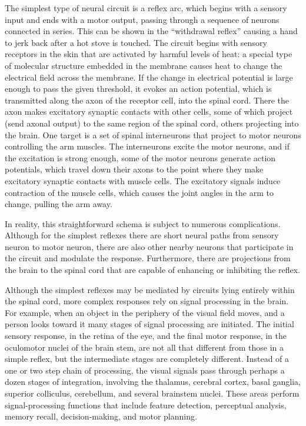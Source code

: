 \documentclass[]{book}
\begin{document}
The simplest type of neural circuit is a reflex arc, which begins with a sensory input and ends with a motor output, passing through a sequence of neurons connected in series. This can be shown in the ``withdrawal reflex'' causing a hand to jerk back after a hot stove is touched. The circuit begins with sensory receptors in the skin that are activated by harmful levels of heat: a special type of molecular structure embedded in the membrane causes heat to change the electrical field across the membrane. If the change in electrical potential is large enough to pass the given threshold, it evokes an action potential, which is transmitted along the axon of the receptor cell, into the spinal cord. There the axon makes excitatory synaptic contacts with other cells, some of which project (send axonal output) to the same region of the spinal cord, others projecting into the brain. One target is a set of spinal interneurons that project to motor neurons controlling the arm muscles. The interneurons excite the motor neurons, and if the excitation is strong enough, some of the motor neurons generate action potentials, which travel down their axons to the point where they make excitatory synaptic contacts with muscle cells. The excitatory signals induce contraction of the muscle cells, which causes the joint angles in the arm to change, pulling the arm away.

In reality, this straightforward schema is subject to numerous complications. Although for the simplest reflexes there are short neural paths from sensory neuron to motor neuron, there are also other nearby neurons that participate in the circuit and modulate the response. Furthermore, there are projections from the brain to the spinal cord that are capable of enhancing or inhibiting the reflex.

Although the simplest reflexes may be mediated by circuits lying entirely within the spinal cord, more complex responses rely on signal processing in the brain. For example, when an object in the periphery of the visual field moves, and a person looks toward it many stages of signal processing are initiated. The initial sensory response, in the retina of the eye, and the final motor response, in the oculomotor nuclei of the brain stem, are not all that different from those in a simple reflex, but the intermediate stages are completely different. Instead of a one or two step chain of processing, the visual signals pass through perhaps a dozen stages of integration, involving the thalamus, cerebral cortex, basal ganglia, superior colliculus, cerebellum, and several brainstem nuclei. These areas perform signal-processing functions that include feature detection, perceptual analysis, memory recall, decision-making, and motor planning.
\end{document}
